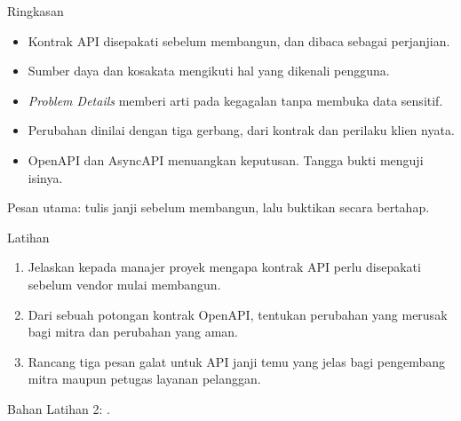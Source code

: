 \documentclass[aspectratio=169, table, 12pt]{beamer}
\begin{document}
\begin{frame}{{\Large Ringkasan}}
  \vspace{8pt}
  \begin{itemize}
    \item Kontrak API disepakati sebelum membangun, dan dibaca sebagai perjanjian.
    \item Sumber daya dan kosakata mengikuti hal yang dikenali pengguna.
    \item \textit{Problem Details} memberi arti pada kegagalan tanpa membuka data sensitif.
    \item Perubahan dinilai dengan tiga gerbang, dari kontrak dan perilaku klien nyata.
    \item OpenAPI dan AsyncAPI menuangkan keputusan. Tangga bukti menguji isinya.
  \end{itemize}
  \vspace{6pt}
  {\small Pesan utama: tulis janji sebelum membangun, lalu buktikan secara bertahap.}
\end{frame}

\begin{frame}{{\Large Latihan}}
  \vspace{8pt}
  \begin{enumerate}
    \item Jelaskan kepada manajer proyek mengapa kontrak API perlu disepakati sebelum vendor mulai membangun.
    \item Dari sebuah potongan kontrak OpenAPI, tentukan perubahan yang merusak bagi mitra dan perubahan yang aman.
    \item Rancang tiga pesan galat untuk API janji temu yang jelas bagi pengembang mitra maupun petugas layanan pelanggan.
  \end{enumerate}
  \vspace{6pt}
  {\small Bahan Latihan 2: .\par}
\end{frame}
\end{document}
